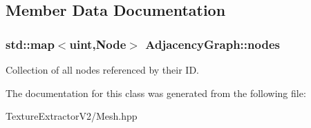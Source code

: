 \subsection{Member Data Documentation}
\hypertarget{class_adjacency_graph_ad3e7a730db698841d4230030898f4291}{}
\subsubsection[{nodes}]{\setlength{\rightskip}{0pt plus 5cm}std\+::map$<$uint,Node$>$ Adjacency\+Graph\+::nodes}\label{class_adjacency_graph_ad3e7a730db698841d4230030898f4291}
Collection of all nodes referenced by their I\+D. 

The documentation for this class was generated from the following file\+:\begin{DoxyCompactItemize}
\item 
Texture\+Extractor\+V2/Mesh.\+hpp\end{DoxyCompactItemize}
